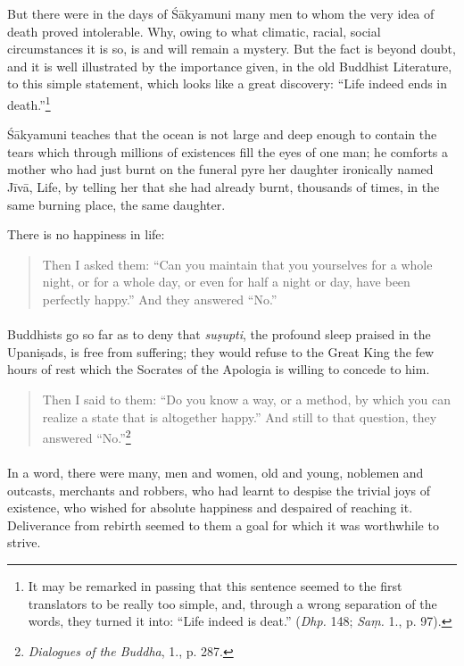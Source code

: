 \documentclass[a4paper, 11pt, oneside, english, landscape]{article}
\begin{document}
But there were in the days of Śākyamuni many men to whom the very idea of death proved intolerable. Why, owing to what climatic, racial, social circumstances it is so, is and will remain a mystery. But the fact is beyond doubt, and it is well illustrated by the importance given, in the old Buddhist Literature, to this simple statement, which looks like a great discovery: ``Life indeed ends in death.''\footnote{It may be remarked in passing that this sentence seemed to the first translators to be really too simple, and, through a wrong separation of the words, they turned it into: ``Life indeed is deat.'' (\emph{Dhp.} 148; \emph{Saṃ.} 1., p. 97).}

Śākyamuni teaches that the ocean is not large and deep enough to contain the tears which through millions of existences fill the eyes of one man; he comforts a mother who had just burnt on the funeral pyre her daughter ironically named Jīvā, Life, by telling her that she had already burnt, thousands of times, in the same burning place, the same daughter.

There is no happiness in life:
\begin{quotation}
\small
Then I asked them: ``Can you maintain that you yourselves for a whole night, or for a whole day, or even for half a night or day, have been perfectly happy.'' And they answered ``No.''
\end{quotation}
\paragraph{}
Buddhists go so far as to deny that \emph{suṣupti}, the profound sleep praised in the Upaniṣads, is free from suffering; they would refuse to the Great King the few hours of rest which the Socrates of the Apologia is willing to concede to him.
\begin{quotation}
\small
Then I said to them: ``Do you know a way, or a method, by which you can realize a state that is altogether happy.'' And still to that question, they answered ``No.''\footnote{\emph{Dialogues of the Buddha}, 1., p. 287.}
\end{quotation}
\paragraph{}
In a word, there were many, men and women, old and young, noblemen and outcasts, merchants and robbers, who had learnt to despise the trivial joys of existence, who wished for absolute happiness and despaired of reaching it. Deliverance from rebirth seemed to them a goal for which it was worthwhile to strive.
\end{document}
